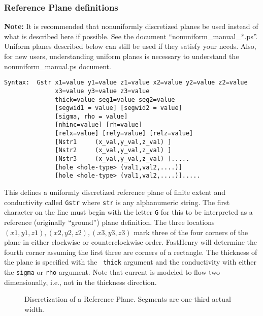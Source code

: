 \subsubsection{Reference Plane definitions}
\label{planes}

{\bf Note:} It is recommended that nonuniformly discretized planes be
used instead of what is described here if possible.   
See the document ``nonuniform\_manual\_*.ps''.
Uniform planes described below can still be used if they satisfy your
needs. Also, for new users, understanding uniform planes is necessary to
understand the nonuniform\_manual.ps document.

\vspace{0.1in}

\begin{verbatim}
Syntax:  Gstr x1=value y1=value z1=value x2=value y2=value z2=value 
              x3=value y3=value z3=value
              thick=value seg1=value seg2=value 
              [segwid1 = value] [segwid2 = value] 
              [sigma, rho = value] 
              [nhinc=value] [rh=value] 
              [relx=value] [rely=value] [relz=value]
              [Nstr1     (x_val,y_val,z_val) ] 
              [Nstr2     (x_val,y_val,z_val) ]
              [Nstr3     (x_val,y_val,z_val) ].....
              [hole <hole-type> (val1,val2,....)]              
              [hole <hole-type> (val1,val2,....)].....
\end{verbatim}

This defines a uniformly discretized reference plane of finite extent
and conductivity called {\tt Gstr} where {\tt str} is any alphanumeric
string.  The first character on the line must begin with the letter
{\tt G} for this to be interpreted as a reference (originally
``ground'') plane definition.  The three locations $(x1,y1,z1),
(x2,y2,z2), (x3, y3, z3)$ mark three of the four corners of the plane
in either clockwise or counterclockwise order. FastHenry will
determine the fourth corner assuming the first three are corners of a
rectangle.  The thickness of the plane is specified with the {\tt
  thick} argument and the conductivity with either the {\tt sigma} or
{\tt rho} argument.  Note that current is modeled to flow two
dimensionally, i.e., not in the thickness direction.

\begin{figure}
\centerline{
}
\caption{Discretization of a Reference Plane. Segments are one-third actual width.}
\label{gp}
\end{figure}

